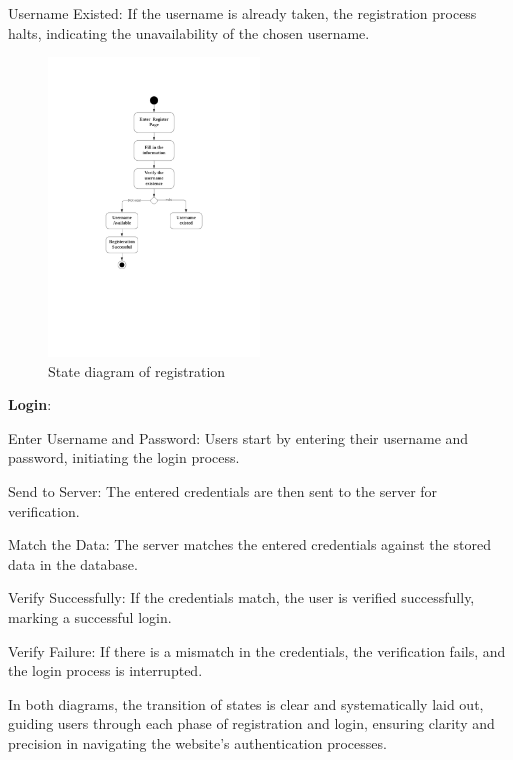 \documentclass[conference]{IEEEtran}
\begin{document}
Username Existed: If the username is already taken, the registration process halts, indicating the unavailability of the chosen username.
\begin{figure}[htbp]
	\centerline{\includegraphics[width=0.5\textwidth]{Diagram_of_Login_and_Register/State_diagram_of_registration.pdf}}
	\caption{State diagram of registration }
	\label{State_diagram_of_registration}
\end{figure}
\textbf{Login}:

Enter Username and Password: Users start by entering their username and password, initiating the login process.

Send to Server: The entered credentials are then sent to the server for verification.

Match the Data: The server matches the entered credentials against the stored data in the database.

Verify Successfully: If the credentials match, the user is verified successfully, marking a successful login.

Verify Failure: If there is a mismatch in the credentials, the verification fails, and the login process is interrupted.

In both diagrams, the transition of states is clear and systematically laid out, guiding users through each phase of registration and login, ensuring clarity and precision in navigating the website’s authentication processes.
\end{document}
